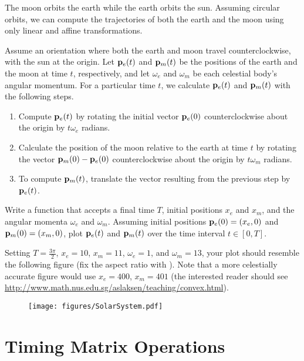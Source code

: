 \begin{problem} %
The moon orbits the earth while the earth orbits the sun.
Assuming circular orbits, we can compute the trajectories of both the earth and the moon using only linear and affine transformations.

Assume an orientation where both the earth and moon travel counterclockwise, with the sun at the origin.
Let $\mathbf{p}_e(t)$ and $\mathbf{p}_m(t)$ be the positions of the earth and the moon at time $t$, respectively, and let $\omega_e$ and $\omega_m$ be each celestial body's angular momentum.
For a particular time $t$, we calculate $\mathbf{p}_e(t)$ and $\mathbf{p}_m(t)$ with the following steps.
\begin{enumerate}
\item Compute $\mathbf{p}_e(t)$ by rotating the initial vector $\mathbf{p}_e(0)$ counterclockwise about the origin by $t\omega_e$ radians.
\item Calculate the position of the moon relative to the earth at time $t$ by rotating the vector $\mathbf{p}_m(0) - \mathbf{p}_e(0)$ counterclockwise about the origin by $t\omega_m$ radians.
\item To compute $\mathbf{p}_m(t)$, translate the vector resulting from the previous step by $\mathbf{p}_e(t)$.
\end{enumerate}

Write a function that accepts a final time $T$, initial positions $x_e$ and $x_m$, and the angular momenta $\omega_e$ and $\omega_m$.
Assuming initial positions $\mathbf{p}_e(0) = (x_e,0)$ and $\mathbf{p}_m(0) = (x_m,0)$, plot $\mathbf{p}_e(t)$ and $\mathbf{p}_m(t)$ over the time interval $t \in [0, T]$.

Setting $T = \frac{3\pi}{2}$, $x_e=10$, $x_m=11$, $\omega_e = 1$, and $\omega_m = 13$, your plot should resemble the following figure (fix the aspect ratio with ).
Note that a more celestially accurate figure would use $x_e=400$, $x_m=401$ (the interested reader should see \url{http://www.math.nus.edu.sg/aslaksen/teaching/convex.html}).

\begin{figure}[H]
    \texttt{[image: figures/SolarSystem.pdf]}
\end{figure}

\label{prob:solar-system-trajectories}
\end{problem}

\section*{Timing Matrix Operations} %

